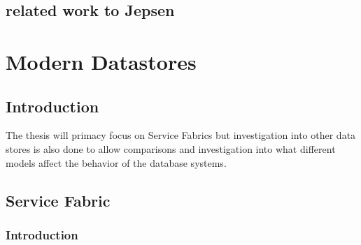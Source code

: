 \documentclass[a4paper,10pt,titlepage]{report}
\begin{document}
\section{related work to Jepsen}









    \newpage


    \chapter{Modern Datastores}


    \section{Introduction}

    The thesis will primacy focus on Service Fabrics but investigation into other data stores is also done to allow comparisons and investigation into what different models affect the behavior of the database systems.


    \section{Service Fabric}

%

    \subsection{Introduction}
\end{document}
